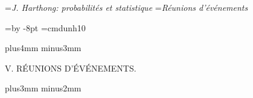 


\auteurcourant={\sl J. Harthong: probabilit\'es et statistique}
\titrecourant={\sl R\'eunions d'\'ev\'enements}


\newdimen\blocksize  \blocksize=\vsize \advance\blocksize by -8pt
\font\gtm=cmdunh10
\def\struta{\vrule depth1.8pt width0pt}
\def\strutb{\vrule height7.5pt width0pt}
\def\ata{\hskip-2.5pt}
\def\aub{\hskip1pt}
\def\rom{\hbox{\gtm R}}
\def\qom{\hbox{\gtm Q}}
\def\som{\hbox{\gtm S}}
\def\bgl{\raise1.3pt\hbox{$($}}
\def\bgr{\raise1.3pt\hbox{$)$}}

\null\vskip10mm plus4mm minus3mm

\centerline{\tit V\ata .  R\'EUNIONS D'\'EV\'ENEMENTS.}

\vskip10mm plus3mm minus2mm

